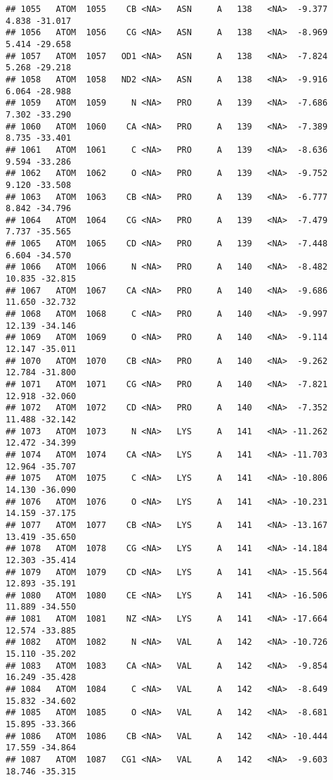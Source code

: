 \documentclass[
]{article}
\begin{document}
\begin{verbatim}
## 1055   ATOM  1055    CB <NA>   ASN     A   138   <NA>  -9.377   4.838 -31.017
## 1056   ATOM  1056    CG <NA>   ASN     A   138   <NA>  -8.969   5.414 -29.658
## 1057   ATOM  1057   OD1 <NA>   ASN     A   138   <NA>  -7.824   5.268 -29.218
## 1058   ATOM  1058   ND2 <NA>   ASN     A   138   <NA>  -9.916   6.064 -28.988
## 1059   ATOM  1059     N <NA>   PRO     A   139   <NA>  -7.686   7.302 -33.290
## 1060   ATOM  1060    CA <NA>   PRO     A   139   <NA>  -7.389   8.735 -33.401
## 1061   ATOM  1061     C <NA>   PRO     A   139   <NA>  -8.636   9.594 -33.286
## 1062   ATOM  1062     O <NA>   PRO     A   139   <NA>  -9.752   9.120 -33.508
## 1063   ATOM  1063    CB <NA>   PRO     A   139   <NA>  -6.777   8.842 -34.796
## 1064   ATOM  1064    CG <NA>   PRO     A   139   <NA>  -7.479   7.737 -35.565
## 1065   ATOM  1065    CD <NA>   PRO     A   139   <NA>  -7.448   6.604 -34.570
## 1066   ATOM  1066     N <NA>   PRO     A   140   <NA>  -8.482  10.835 -32.815
## 1067   ATOM  1067    CA <NA>   PRO     A   140   <NA>  -9.686  11.650 -32.732
## 1068   ATOM  1068     C <NA>   PRO     A   140   <NA>  -9.997  12.139 -34.146
## 1069   ATOM  1069     O <NA>   PRO     A   140   <NA>  -9.114  12.147 -35.011
## 1070   ATOM  1070    CB <NA>   PRO     A   140   <NA>  -9.262  12.784 -31.800
## 1071   ATOM  1071    CG <NA>   PRO     A   140   <NA>  -7.821  12.918 -32.060
## 1072   ATOM  1072    CD <NA>   PRO     A   140   <NA>  -7.352  11.488 -32.142
## 1073   ATOM  1073     N <NA>   LYS     A   141   <NA> -11.262  12.472 -34.399
## 1074   ATOM  1074    CA <NA>   LYS     A   141   <NA> -11.703  12.964 -35.707
## 1075   ATOM  1075     C <NA>   LYS     A   141   <NA> -10.806  14.130 -36.090
## 1076   ATOM  1076     O <NA>   LYS     A   141   <NA> -10.231  14.159 -37.175
## 1077   ATOM  1077    CB <NA>   LYS     A   141   <NA> -13.167  13.419 -35.650
## 1078   ATOM  1078    CG <NA>   LYS     A   141   <NA> -14.184  12.303 -35.414
## 1079   ATOM  1079    CD <NA>   LYS     A   141   <NA> -15.564  12.893 -35.191
## 1080   ATOM  1080    CE <NA>   LYS     A   141   <NA> -16.506  11.889 -34.550
## 1081   ATOM  1081    NZ <NA>   LYS     A   141   <NA> -17.664  12.574 -33.885
## 1082   ATOM  1082     N <NA>   VAL     A   142   <NA> -10.726  15.110 -35.202
## 1083   ATOM  1083    CA <NA>   VAL     A   142   <NA>  -9.854  16.249 -35.428
## 1084   ATOM  1084     C <NA>   VAL     A   142   <NA>  -8.649  15.832 -34.602
## 1085   ATOM  1085     O <NA>   VAL     A   142   <NA>  -8.681  15.895 -33.366
## 1086   ATOM  1086    CB <NA>   VAL     A   142   <NA> -10.444  17.559 -34.864
## 1087   ATOM  1087   CG1 <NA>   VAL     A   142   <NA>  -9.603  18.746 -35.315

\end{verbatim}
\end{document}
